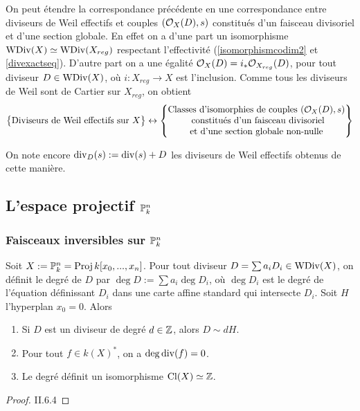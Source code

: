 On peut étendre la correspondance précédente en une correspondance entre diviseurs de Weil effectifs et couples $(\mathcal{O}_X(D),s)$ constitués d'un faisceau divisoriel et d'une section globale. En effet on a d'une part un isomorphisme $\operatorname{WDiv}(X)\simeq\operatorname{WDiv}(X_{reg})$ respectant l'effectivité (\ref{isomorphismcodim2} et \ref{divexactseq}). D'autre part on a une égalité $\mathcal{O}_X(D)= i_*\mathcal{O}_{X_{reg}}(D)$, pour tout diviseur $D\in\operatorname{WDiv}(X)$, où $i:X_{reg}\rightarrow X$ est l'inclusion. Comme tous les diviseurs de Weil sont de Cartier sur $X_{reg}$, on obtient
$$
\left\{
\begin{matrix}
\text{Diviseurs de Weil effectifs sur }X
\end{matrix}
\right\}
\leftrightarrow
\left\{
\begin{matrix}
\text{Classes d'isomorphies de couples }(\mathcal{O}_X(D), s)\\
\text{ constitués d'un faisceau divisoriel}\\
\text{et d'une section globale non-nulle}
\end{matrix}
\right\}
$$

On note encore $\operatorname{div}_D(s):=\operatorname{div}(s)+D$ les diviseurs de Weil effectifs obtenus de cette manière.
\subsection{L'espace projectif $\mathbb{P}_k^n$}

\subsubsection{Faisceaux inversibles sur $\mathbb{P}_k^n$}

\begin{prop}
Soit $X:=\mathbb{P}_k^n=\operatorname{Proj} k[x_0,...,x_n]$. Pour tout diviseur $D=\sum a_i D_i\in\operatorname{WDiv}(X)$, on définit le degré de $D$ par $\deg D:=\sum a_i\deg D_i$, où $\deg D_i$ est le degré de l'équation définissant $D_i$ dans une carte affine standard qui intersecte $D_i$. Soit $H$ l'hyperplan $x_0=0$. Alors
\begin{enumerate}
\item Si $D$ est un diviseur de degré $d\in \mathbb{Z}$, alors $D\sim dH$.
\item Pour tout $f\in k(X)^*$, on a $\deg\operatorname{div}(f)=0$.
\item Le degré définit un isomorphisme $\operatorname{Cl}(X)\simeq \mathbb{Z}$.
\end{enumerate}
\end{prop}
\begin{proof}
\cite{Hartshorne} II.6.4
\end{proof}

